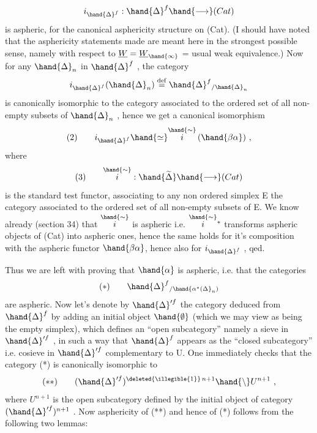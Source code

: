 \[ i_{\hand{\Delta}^f} : \hand{\Delta}^f \hand{\longrightarrow} (Cat) \]
is aspheric,  for the canonical asphericity structure on (Cat).  (I
should have noted that the asphericity statements made are meant here
in the strongest possible sense,  namely with respect to $\underline{W} = \underline{W}_{\hand{\infty}}$ = usual
weak equivalence.)  Now for any $\hand{\Delta}_n$ in $\hand{\Delta}^f$ ,  the category
\[ i_{\hand{\Delta}^f}(\hand{\Delta}_n) \overset{\mathrm{def}}{=} \hand{\Delta}^f{}_{/\hand{\Delta}_n} \]
is canonically isomorphic to the category associated to the ordered set
of all non-empty subsets of $\hand{\Delta}_n$ ,  hence we get a canonical isomorphism
\[ (2) \qquad i_{\hand{\Delta}^f} \hand{\simeq} \overset{\hand{\sim}}{i}\,(\hand{\beta\alpha}) \ , \]
where
\[ (3) \qquad \overset{\hand{\sim}}{i} : \hand{\widetilde{\Delta}} \hand{\longrightarrow} (Cat) \]
is the standard test functor,  associating to any non ordered simplex
E the category associated to the ordered set of all non-empty subsets
of E.  We know already (section 34) that $\overset{\hand{\sim}}{i}$ is aspheric  i.e.
$\overset{\hand{\sim}}{i}{}^{*}$ transforms aspheric objects of (Cat) into aspheric ones,  hence the
same holds for it's composition with the aspheric functor $\hand{\beta\alpha}$, hence
also for $i_{\hand{\Delta}^f}$ ,  qed.

Thus we are left with proving that $\hand{\alpha}$ is aspheric,  i.e. that the
categories
\[ (*) \qquad \hand{\Delta}^f{}_{/\hand{\alpha^*(\Delta}_n)} \]
are aspheric.  Now let's denote by $\hand{\Delta}'^f$ the category deduced from $\hand{\Delta}^f$
by adding an initial object $\hand{\emptyset}$ (which we may view as being the empty
simplex),   which defines an ``open subcategory''  namely a
sieve in $\hand{\Delta}'^f$ ,   in such a way that $\hand{\Delta}^f$ appears as
the ``closed subcategory'' i.e. cosieve in $\hand{\Delta}'^f$ complementary to U.  One
immediately checks that the category (*) is canonically isomorphic to
\[ (**) \qquad (\hand{\Delta}'^f)^{\deleted{\illegible{1}}\, n+1} \hand{\setminus} U^{n+1} \ , \]
where $U^{n+1}$ is the open subcategory defined by the initial object of
  category $(\hand{\Delta}'^f)^{n+1}$ .  Now asphericity of (**) and hence
of (*) follows from the following two lemmas:

